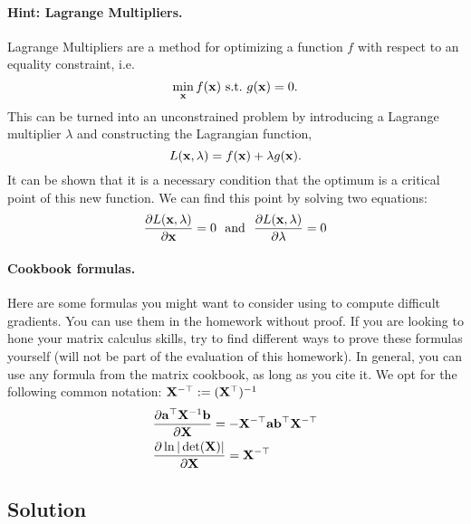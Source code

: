 \documentclass[submit]{harvardml}
\begin{document}
\begin{problem}
\paragraph{Hint: Lagrange Multipliers.} Lagrange Multipliers are a method for
optimizing a function $f$ with respect to an
equality constraint, i.e.
\[\min_{\mathbf{x}} f(\mathbf{x})\ \text{s.t.}\ g(\mathbf{x}) = 0.\]
This can be turned into an unconstrained problem by introducing a
Lagrange multiplier $\lambda$ and constructing the Lagrangian function,
\[L(\mathbf{x}, \lambda) =  f(\mathbf{x}) + \lambda g(\mathbf{x}).\]
It can be shown that it is a necessary condition that the optimum
is a critical point of this new function. We can find this point by solving two equations:
\[\frac{\partial L(\mathbf{x}, \lambda)}{\partial  \mathbf{x}} = 0  \ \ \text{and}\  \  \frac{\partial L(\mathbf{x}, \lambda)}{\partial \lambda} = 0 \]
\paragraph{Cookbook formulas.} Here are some formulas you might want to consider
using to compute difficult gradients. You can use them  in the homework
without proof. If you are looking to hone your matrix calculus skills, try to
find different ways to prove these formulas yourself (will not be part of the
evaluation of this homework). In general, you can use any formula from the matrix cookbook,
as long as you cite it. We opt for the following common notation:
$\mathbf{X}^{-\top} := (\mathbf{X}^{\top})^{-1}$
\begin{align*}
  & \frac{\partial \mathbf{a}^\top \mathbf{X}^{-1} \mathbf{b}}{\partial \mathbf{X}} = - \mathbf{X}^{-\top} \mathbf{a} \mathbf{b}^\top \mathbf{X}^{-\top} \\
  & \frac{\partial \ln | \det (\mathbf{X}) |}{\partial \mathbf{X}} = \mathbf{X}^{-\top}
 \end{align*}
 \end{problem}
\subsection*{Solution}
\end{document}
